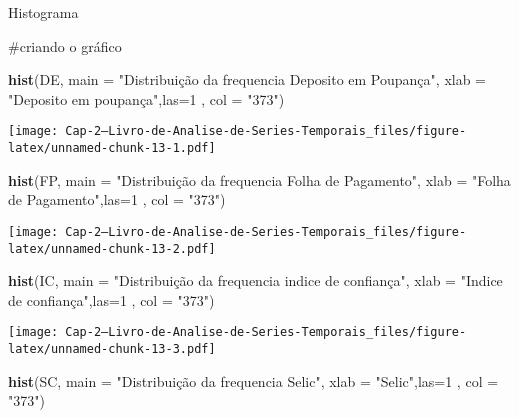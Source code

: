 \documentclass[]{article}
\newenvironment{Shaded}{\begin{snugshade}}{\end{snugshade}}
\newcommand{\DataTypeTok}[1]{\textcolor[rgb]{0.13,0.29,0.53}{#1}}
\newcommand{\DecValTok}[1]{\textcolor[rgb]{0.00,0.00,0.81}{#1}}
\newcommand{\KeywordTok}[1]{\textcolor[rgb]{0.13,0.29,0.53}{\textbf{#1}}}
\newcommand{\NormalTok}[1]{#1}
\newcommand{\StringTok}[1]{\textcolor[rgb]{0.31,0.60,0.02}{#1}}
\begin{document}
Histograma

\#criando o gráfico

\begin{Shaded}
\begin{Highlighting}[]
\KeywordTok{hist}\NormalTok{(DE, }\DataTypeTok{main =} \StringTok{"Distribuição da frequencia Deposito em Poupança"}\NormalTok{, }
     \DataTypeTok{xlab =} \StringTok{"Deposito em poupança"}\NormalTok{,}\DataTypeTok{las=}\DecValTok{1}\NormalTok{ , }\DataTypeTok{col =} \StringTok{"373"}\NormalTok{)}
\end{Highlighting}
\end{Shaded}

\texttt{[image: Cap-2---Livro-de-Analise-de-Series-Temporais\_files/figure-latex/unnamed-chunk-13-1.pdf]}

\begin{Shaded}
\begin{Highlighting}[]
\KeywordTok{hist}\NormalTok{(FP, }\DataTypeTok{main =} \StringTok{"Distribuição da frequencia Folha de Pagamento"}\NormalTok{, }
     \DataTypeTok{xlab =} \StringTok{"Folha de Pagamento"}\NormalTok{,}\DataTypeTok{las=}\DecValTok{1}\NormalTok{ , }\DataTypeTok{col =} \StringTok{"373"}\NormalTok{)}
\end{Highlighting}
\end{Shaded}

\texttt{[image: Cap-2---Livro-de-Analise-de-Series-Temporais\_files/figure-latex/unnamed-chunk-13-2.pdf]}

\begin{Shaded}
\begin{Highlighting}[]
\KeywordTok{hist}\NormalTok{(IC, }\DataTypeTok{main =} \StringTok{"Distribuição da frequencia indice de confiança"}\NormalTok{,}
     \DataTypeTok{xlab =} \StringTok{"Indice de confiança"}\NormalTok{,}\DataTypeTok{las=}\DecValTok{1}\NormalTok{ , }\DataTypeTok{col =} \StringTok{"373"}\NormalTok{)}
\end{Highlighting}
\end{Shaded}

\texttt{[image: Cap-2---Livro-de-Analise-de-Series-Temporais\_files/figure-latex/unnamed-chunk-13-3.pdf]}

\begin{Shaded}
\begin{Highlighting}[]
\KeywordTok{hist}\NormalTok{(SC, }\DataTypeTok{main =} \StringTok{"Distribuição da frequencia Selic"}\NormalTok{, }
     \DataTypeTok{xlab =} \StringTok{"Selic"}\NormalTok{,}\DataTypeTok{las=}\DecValTok{1}\NormalTok{ , }\DataTypeTok{col =} \StringTok{"373"}\NormalTok{)}
\end{Highlighting}
\end{Shaded}
\end{document}
